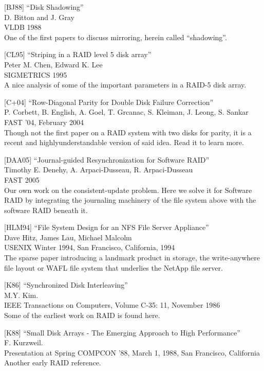 {[}BJ88{]} ``Disk Shadowing''\\
D. Bitton and J. Gray\\
VLDB 1988\\
One of the first papers to discuss mirroring, herein called
``shadowing''.

{[}CL95{]} ``Striping in a RAID level 5 disk array''\\
Peter M. Chen, Edward K. Lee\\
SIGMETRICS 1995\\
A nice analysis of some of the important parameters in a RAID-5 disk
array.

{[}C+04{]} ``Row-Diagonal Parity for Double Disk Failure Correction''\\
P. Corbett, B. English, A. Goel, T. Grcanac, S. Kleiman, J. Leong, S.
Sankar\\
FAST '04, February 2004\\
Though not the first paper on a RAID system with two disks for parity,
it is a recent and highlyunderstandable version of said idea. Read it to
learn more.

{[}DAA05{]} ``Journal-guided Resynchronization for Software RAID''\\
Timothy E. Denehy, A. Arpaci-Dusseau, R. Arpaci-Dusseau\\
FAST 2005\\
Our own work on the consistent-update problem. Here we solve it for
Software RAID by integrating the journaling machinery of the file system
above with the software RAID beneath it.

{[}HLM94{]} ``File System Design for an NFS File Server Appliance''\\
Dave Hitz, James Lau, Michael Malcolm\\
USENIX Winter 1994, San Francisco, California, 1994\\
The sparse paper introducing a landmark product in storage, the
write-anywhere file layout or WAFL file system that underlies the NetApp
file server.

{[}K86{]} ``Synchronized Disk Interleaving''\\
M.Y. Kim.\\
IEEE Transactions on Computers, Volume C-35: 11, November 1986\\
Some of the earliest work on RAID is found here.

{[}K88{]} ``Small Disk Arrays - The Emerging Approach to High
Performance''\\
F. Kurzweil.\\
Presentation at Spring COMPCON '88, March 1, 1988, San Francisco,
California Another early RAID reference.

